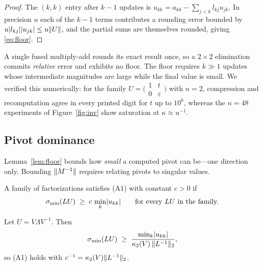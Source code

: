 \begin{proof}
The $(k,k)$ entry after $k-1$ updates is
$u_{kk}=a_{kk}-\sum_{j<k}l_{kj}u_{jk}$. In precision $u$ each of the $k-1$ terms
contributes a rounding error bounded by $u\lvert l_{kj} \rvert\lvert u_{jk} \rvert\le u\lVert U \rVert$,
and the partial sums are themselves rounded, giving \eqref{eq:floor}.
\end{proof}

\begin{remark}\label{rem:fma}
A single fused multiply-add rounds its exact result once, so a $2\times2$
elimination commits \emph{relative} error and exhibits no floor. The floor
requires $k\gg1$ updates whose intermediate magnitudes are large while the final
value is small. We verified this numerically: for the family
$U=\bigl(\begin{smallmatrix}1&t\\0&\varepsilon\end{smallmatrix}\bigr)$ with $n=2$,
compression and recomputation agree in every printed digit for $t$ up to
$10^{6}$, whereas the $n=48$ experiments of Figure~\ref{fig:inv} show saturation
at $\kappa\approx u^{-1}$.
\end{remark}

\subsection{Pivot dominance}\label{sec:dominance}

Lemma~\ref{lem:floor} bounds how \emph{small} a computed pivot can be---one
direction only. Bounding $\lVert M^{-1} \rVert$ requires relating pivots to singular
values.

\begin{definition}\label{def:A1}
A family of factorizations satisfies (A1) with constant $c>0$ if
\begin{equation}
  \sigma_{\min}(LU)\;\ge\;c\,\min_{k}\lvert u_{kk} \rvert
  \qquad\text{for every }LU\text{ in the family.}
\end{equation}
\end{definition}

\begin{proposition}\label{prop:A1-suff}
Let $U=V\Lambda V^{-1}$. Then
\begin{equation}
  \sigma_{\min}(LU)\;\ge\;\frac{\min_k\lvert u_{kk} \rvert}{\kappa_2(V)\,\lVert L^{-1} \rVert_2},
\end{equation}
so (A1) holds with $c^{-1}=\kappa_2(V)\lVert L^{-1} \rVert_2$.
\end{proposition}

